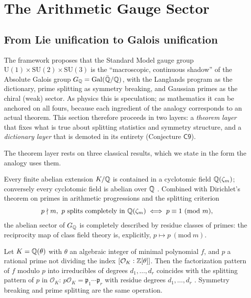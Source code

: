 
\section{The Arithmetic Gauge Sector}\label{sec:galois}

\subsection{From Lie unification to Galois unification}

The framework proposes that the Standard Model gauge group
$\mathrm{U}(1)\times\mathrm{SU}(2)\times\mathrm{SU}(3)$ is the ``macroscopic, continuous
shadow'' of the Absolute Galois group $G_{\mathbb{Q}}=\operatorname{Gal}(\bar{\mathbb{Q}}/\mathbb{Q})$, with the Langlands
program as the dictionary, prime splitting as symmetry breaking, and Gaussian primes as the
chiral (weak) sector. As physics this is speculation; as mathematics it can be anchored on
all fours, because each ingredient of the analogy corresponds to an actual theorem. This
section therefore proceeds in two layers: a \emph{theorem layer} that fixes what is
true about splitting statistics and symmetry structure, and a \emph{dictionary layer} that
is demoted in its entirety (Conjecture $\mathsf{C9}$).

The theorem layer rests on three classical results, which we state in the form the analogy
uses them.

\begin{theorem}\label{thm:kw}
Every finite abelian extension $K/\mathbb{Q}$ is contained in a cyclotomic field
$\mathbb{Q}(\zeta_{m})$; conversely every cyclotomic field is abelian over $\mathbb{Q}$
\cite{neukirch1999}. Combined with Dirichlet's theorem on primes in arithmetic
progressions \cite{dirichlet1837} and the splitting criterion
\begin{equation}\label{eq:splittingcriterion}
p\nmid m,\ p\ \text{splits completely in}\ \mathbb{Q}(\zeta_{m})
\iff p\equiv1\ (\mathrm{mod}\ m),
\end{equation}
the abelian sector of $G_{\mathbb{Q}}$ is completely described by residue classes of primes: the
reciprocity map of class field theory is, explicitly, $p\mapsto p\ (\mathrm{mod}\ m)$.
\end{theorem}

\begin{theorem}\label{thm:kummer}
Let $K=\mathbb{Q}(\theta)$ with $\theta$ an algebraic integer of minimal polynomial $f$, and $p$ a
rational prime not dividing the index $[\mathcal{O}_{K}:\mathbb{Z}[\theta]]$. Then the factorization
pattern of $f$ modulo $p$ into irreducibles of degrees $d_{1},\dots,d_{r}$ coincides with
the splitting pattern of $p$ in $\mathcal{O}_{K}$: $p\mathcal{O}_{K}
=\mathfrak{p}_{1}\cdots\mathfrak{p}_{r}$ with residue degrees $d_{1},\dots,d_{r}$
\cite{neukirch1999}. Symmetry breaking and prime splitting are the same operation.
\end{theorem}

